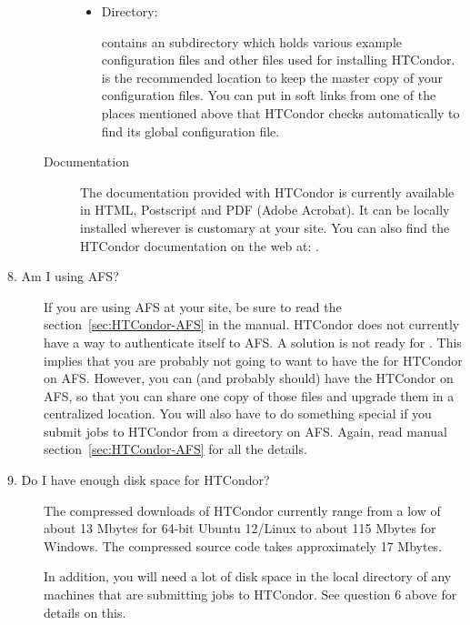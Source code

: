 \begin{description}
\begin{description}
\begin{itemize}
     \item {} Directory:

      contains an  subdirectory which holds various
     example configuration files and other files used for installing HTCondor.
      is the recommended location to keep the master copy of your
     configuration files.  You can put in soft links from one of the places
     mentioned above that HTCondor checks automatically to find its
     global configuration file. 
\end{itemize}

\item[Documentation]

The documentation provided with HTCondor is currently available in
     HTML, Postscript and PDF (Adobe Acrobat).  It can be locally installed
     wherever is customary at your site.  You can also find the HTCondor
     documentation on the web at:
     .

\end{description}

\item[8. Am I using AFS?]

If you are using AFS at your site, be sure to read the
section~\ref{sec:HTCondor-AFS} in the
manual.
HTCondor does not currently have a way to authenticate itself to AFS.
A solution is not ready for
\VersionNotice.
This implies that you are probably not going to want
to have the  for HTCondor on AFS.
However, you can
(and probably should) have the HTCondor  on AFS, so
that you can share one copy of those files and upgrade them in a
centralized location.  You will also have to do something special if
you submit jobs to HTCondor from a directory on AFS.  Again, read manual
section~\ref{sec:HTCondor-AFS} for all the details.

\item[9. Do I have enough disk space for HTCondor?]

The compressed downloads of HTCondor currently range from a low of about 13
Mbytes for 64-bit Ubuntu 12/Linux to about 115 Mbytes for Windows.  The
compressed source code takes approximately 17 Mbytes.

In addition, you will need a lot of disk space in the local directory
of any machines that are submitting jobs to HTCondor.  See question 6
above for details on this.

\end{description}

